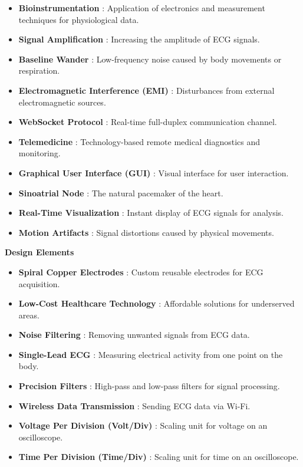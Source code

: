 \begin{itemize}
  \item[] \textbf{Bioinstrumentation} : Application of electronics and measurement techniques for physiological data.
  \item[] \textbf{Signal Amplification} : Increasing the amplitude of ECG signals.
  \item[] \textbf{Baseline Wander} : Low-frequency noise caused by body movements or respiration.
  \item[] \textbf{Electromagnetic Interference (EMI)} : Disturbances from external electromagnetic sources.
  \item[] \textbf{WebSocket Protocol} : Real-time full-duplex communication channel.
  \item[] \textbf{Telemedicine} : Technology-based remote medical diagnostics and monitoring.
  \item[] \textbf{Graphical User Interface (GUI)} : Visual interface for user interaction.
  \item[] \textbf{Sinoatrial Node} : The natural pacemaker of the heart.
  \item[] \textbf{Real-Time Visualization} : Instant display of ECG signals for analysis.
  \item[] \textbf{Motion Artifacts} : Signal distortions caused by physical movements.
\end{itemize}

\vspace{0.5cm}

\begin{center}
  \textbf{Design Elements} 
\end{center}

\begin{itemize}
  \item[] \textbf{Spiral Copper Electrodes} : Custom reusable electrodes for ECG acquisition.
  \item[] \textbf{Low-Cost Healthcare Technology} : Affordable solutions for underserved areas.
  \item[] \textbf{Noise Filtering} : Removing unwanted signals from ECG data.
  \item[] \textbf{Single-Lead ECG} : Measuring electrical activity from one point on the body.
  \item[] \textbf{Precision Filters} : High-pass and low-pass filters for signal processing.
  \item[] \textbf{Wireless Data Transmission} : Sending ECG data via Wi-Fi.
  \item[] \textbf{Voltage Per Division (Volt/Div)} : Scaling unit for voltage on an oscilloscope.
  \item[] \textbf{Time Per Division (Time/Div)} : Scaling unit for time on an oscilloscope.
\end{itemize}

